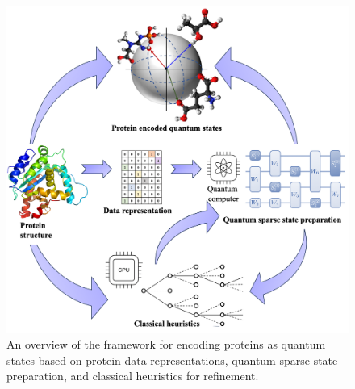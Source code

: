 \begin{figure}[h]
\centering
\includegraphics[width=1.0\linewidth]{main/figs/fig1.png}
\caption{An overview of the framework for encoding proteins as quantum states based on protein data representations, quantum sparse state preparation, and classical heuristics for refinement.}
\label{fig1}
\end{figure}

